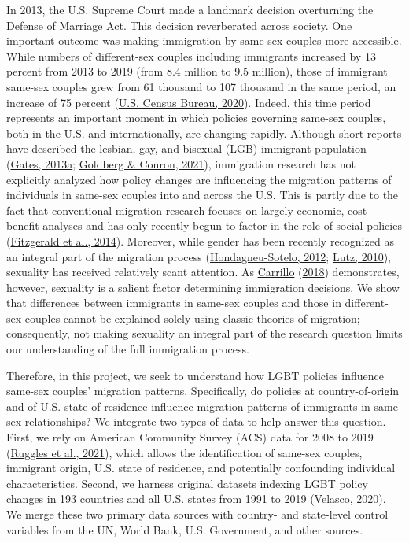 \documentclass[
  11pt,
]{article}
\begin{document}
In 2013, the U.S. Supreme Court made a landmark decision overturning the Defense of Marriage Act. This decision reverberated across society. One important outcome was making immigration by same-sex couples more accessible. While numbers of different-sex couples including immigrants increased by 13 percent from 2013 to 2019 (from 8.4 million to 9.5 million), those of immigrant same-sex couples grew from 61 thousand to 107 thousand in the same period, an increase of 75 percent (\protect\hyperlink{ref-u.s.censusbureau_2020}{U.S. Census Bureau, 2020}). Indeed, this time period represents an important moment in which policies governing same-sex couples, both in the U.S. and internationally, are changing rapidly. Although short reports have described the lesbian, gay, and bisexual (LGB) immigrant population (\protect\hyperlink{ref-gates_2013}{Gates, 2013a}; \protect\hyperlink{ref-goldberg_2021}{Goldberg \& Conron, 2021}), immigration research has not explicitly analyzed how policy changes are influencing the migration patterns of individuals in same-sex couples into and across the U.S. This is partly due to the fact that conventional migration research focuses on largely economic, cost-benefit analyses and has only recently begun to factor in the role of social policies (\protect\hyperlink{ref-fitzgerald_2014}{Fitzgerald et al., 2014}). Moreover, while gender has been recently recognized as an integral part of the migration process (\protect\hyperlink{ref-hondagneu-sotelo_2012}{Hondagneu-Sotelo, 2012}; \protect\hyperlink{ref-lutz_2010}{Lutz, 2010}), sexuality has received relatively scant attention. As \protect\hyperlink{ref-carrillo_2018}{Carrillo} (\protect\hyperlink{ref-carrillo_2018}{2018}) demonstrates, however, sexuality is a salient factor determining immigration decisions. We show that differences between immigrants in same-sex couples and those in different-sex couples cannot be explained solely using classic theories of migration; consequently, not making sexuality an integral part of the research question limits our understanding of the full immigration process.

Therefore, in this project, we seek to understand how LGBT policies influence same-sex couples' migration patterns. Specifically, do policies at country-of-origin and of U.S. state of residence influence migration patterns of immigrants in same-sex relationships? We integrate two types of data to help answer this question. First, we rely on American Community Survey (ACS) data for 2008 to 2019 (\protect\hyperlink{ref-ruggles_2021}{Ruggles et al., 2021}), which allows the identification of same-sex couples, immigrant origin, U.S. state of residence, and potentially confounding individual characteristics. Second, we harness original datasets indexing LGBT policy changes in 193 countries and all U.S. states from 1991 to 2019 (\protect\hyperlink{ref-velasco_2020}{Velasco, 2020}). We merge these two primary data sources with country- and state-level control variables from the UN, World Bank, U.S. Government, and other sources.
\end{document}
